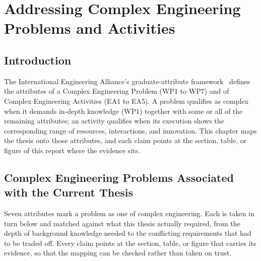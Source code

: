 \chapter{Addressing Complex Engineering Problems and Activities}

\section{Introduction}
The International Engineering Alliance's graduate-attribute
framework~\cite{iea2021gapc} defines the
attributes of a Complex Engineering Problem (WP1 to WP7) and of Complex
Engineering Activities (EA1 to EA5). A problem qualifies as complex when it
demands in-depth knowledge (WP1) together with some or all of the remaining
attributes; an activity qualifies when its execution shows the corresponding
range of resources, interactions, and innovation. This chapter maps the
thesis onto those attributes, and each claim points at the section, table,
or figure of this report where the evidence sits.

\section{Complex Engineering Problems Associated with the Current Thesis}

Seven attributes mark a problem as one of complex engineering. Each is taken in
turn below and matched against what this thesis actually required, from the depth
of background knowledge needed to the conflicting requirements that had to be
traded off. Every claim points at the section, table, or figure that carries its
evidence, so that the mapping can be checked rather than taken on trust.

